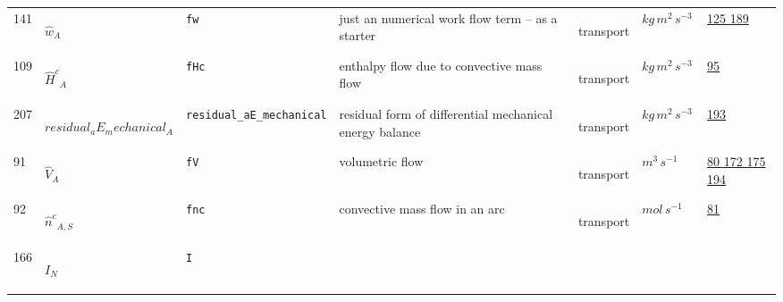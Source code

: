\begin{longtable}{|p{1cm}|p{2.5cm}|p{4.5cm}|p{8cm}|p{3.0cm}|p{3cm}|p{1cm}|}
                 \\
            141
             & \hypertarget{"v:141"}{ $ {{\hat{w}}}{_{A}} $}
             & \verb|fw|
             & just an numerical work flow term -- as a starter
             & \begin{lay}transport \end{lay}
             & $ kg \,m^{2} \,s^{-3} \, $
             &                 \hyperlink{"e:125"}{ 125 }
                                 \hyperlink{"e:189"}{ 189 }
                 \\
            109
             & \hypertarget{"v:109"}{ $ {{\hat{H}^c}}{_{A}} $}
             & \verb|fHc|
             & enthalpy flow due to convective mass flow
             & \begin{lay}transport \end{lay}
             & $ kg \,m^{2} \,s^{-3} \, $
             &                 \hyperlink{"e:95"}{ 95 }
                 \\
            207
             & \hypertarget{"v:207"}{ $ {residual_aE_mechanical}{_{A}} $}
             & \verb|residual_aE_mechanical|
             & residual form of differential mechanical energy balance
             & \begin{lay}transport \end{lay}
             & $ kg \,m^{2} \,s^{-3} \, $
             &                 \hyperlink{"e:193"}{ 193 }
                 \\
            91
             & \hypertarget{"v:91"}{ $ {{\hat{V}}}{_{A}} $}
             & \verb|fV|
             & volumetric flow
             & \begin{lay}transport \end{lay}
             & $ m^{3} \,s^{-1} \, $
             &                 \hyperlink{"e:80"}{ 80 }
                                 \hyperlink{"e:172"}{ 172 }
                                 \hyperlink{"e:175"}{ 175 }
                                 \hyperlink{"e:194"}{ 194 }
                 \\
            92
             & \hypertarget{"v:92"}{ $ {{\hat{n}^c}}{_{A, S}} $}
             & \verb|fnc|
             & convective mass flow in an arc
             & \begin{lay}transport \end{lay}
             & $ mol \,s^{-1} \, $
             &                 \hyperlink{"e:81"}{ 81 }
                 \\
            166
             & \hypertarget{"v:166"}{ $ {I}{_{N}} $}
             & \verb|I|

\end{longtable}
